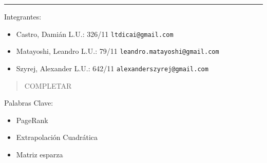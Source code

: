\rule{16 cm}{0.5 mm}

\vspace{2cm}

Integrantes:
\begin{itemize}
	\item Castro, Dami\'an L.U.: 326/11  \verb+ltdicai@gmail.com+
	\item Matayoshi, Leandro L.U.: 79/11 \verb+leandro.matayoshi@gmail.com+
	\item Szyrej, Alexander L.U.: 642/11   \verb+alexanderszyrej@gmail.com+
	
\end{itemize}

\vspace{2cm}

\begin{abstract}
  COMPLETAR
\end{abstract}

\vspace{2cm}

Palabras Clave:
\begin{itemize}
	\item PageRank
	\item Extrapolaci\'on Cuadr\'atica
	\item Matriz esparza
\end{itemize}

